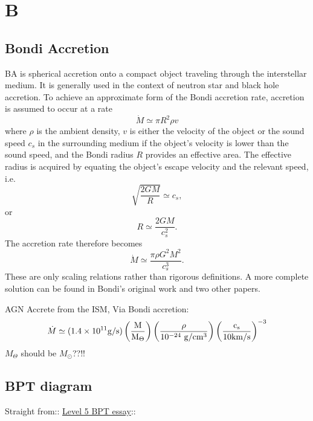 \documentclass[11pt]{article}
\begin{document}
\section*{B}
\subsection*{Bondi Accretion}
BA is spherical accretion onto a compact object traveling through
the interstellar medium. It is generally used in the context of
neutron star and black hole accretion. To achieve an approximate form
of the Bondi accretion rate, accretion is assumed to occur at a rate
\begin{equation}
  \dot {M}\simeq \pi R^{2}\rho v
\end{equation}
where $\rho$ is the ambient density, $v$ is either the velocity of the
object or the sound speed $ c_{s}$ in the surrounding medium if the
object's velocity is lower than the sound speed, and the Bondi radius
$R$ provides an effective area. The effective radius is acquired by
equating the object's escape velocity and the relevant speed, i.e.
\begin{equation}
  \sqrt{\frac{2 G M}{R}} \simeq c_s, 
\end{equation}
or
\begin{equation}
  R\simeq\frac{2 G M}{c_s^2}.
\end{equation}
The accretion rate therefore becomes
\begin{equation}
\dot {M} \simeq \frac{\pi \rho G^{2}M^{2}}{c_{s}^{3}} .
\end{equation}
These are only scaling relations rather than rigorous definitions. A
more complete solution can be found in Bondi's original work and two
other papers.

AGN Accrete from the ISM, Via Bondi accretion:
    \begin{equation}
      \dot{M} \simeq (1.4\times10^{11} \rm{g/s}) \left( \frac{M}{M_{\Theta}} \right) \left( \frac{\rho}{10^{-24}\ \rm{g / cm^{3}}} \right)  \left( \frac{c_s}{10 \rm{km/s}} \right)^{-3}
    \end{equation}
 $M_{\Theta}$ should be $M_{\odot}$??!!

    
\subsection*{BPT diagram}
Straight from:: \href{http://ned.ipac.caltech.edu/level5/Glossary/Essay_bpt.html}{Level 5 BPT essay}::
\end{document}
